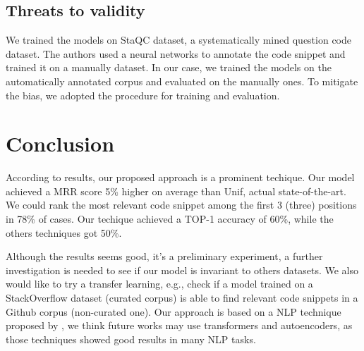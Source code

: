 \documentclass[sigconf]{acmart}
\begin{document}
\subsection{Threats to validity}

We trained the models on StaQC dataset, a systematically mined question code dataset. The authors used a neural networks to annotate the code snippet and trained it on a manually dataset. In our case, we trained the models on the automatically annotated corpus and evaluated on the manually ones. To mitigate the bias, we adopted the \cite{iyer-etal-2016-summarizing} procedure for training and evaluation.

\section{Conclusion}

According to results, our proposed approach is a prominent techique. Our model achieved a MRR score 5\% higher on average than Unif, actual state-of-the-art. We could rank the most relevant code snippet among the first 3 (three) positions in 78\% of cases. Our techique achieved a TOP-1 accuracy of 60\%, while the others techniques got 50\%. 

Although the results seems good, it's a preliminary experiment, a further investigation is needed to see if our model is invariant to others datasets. We also would like to try a transfer learning, e.g., check if a model trained on a StackOverflow dataset (curated corpus) is able to find relevant code snippets in a Github corpus (non-curated one). Our approach is based on a NLP technique proposed by \cite{feng-2015}, we think future works may use transformers and autoencoders, as those techniques showed good results in many NLP tasks. 




\end{document}
